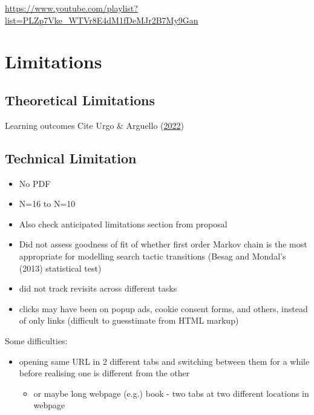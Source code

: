 \documentclass[letterpaper, nobind]{templates/ociamthesis}
\providecommand{\tightlist}{%
  \setlength{\itemsep}{0pt}\setlength{\parskip}{0pt}}
\begin{document}
\url{https://www.youtube.com/playlist?list=PLZp7Vke_WTVr8E4dM1fDeMJr2B7My9Gan}

\hypertarget{limitations}{%
\section{Limitations}\label{limitations}}

\hypertarget{theoretical-limitations}{%
\subsection{Theoretical Limitations}\label{theoretical-limitations}}

Learning outcomes
Cite Urgo \& Arguello (\protect\hyperlink{ref-urgo2022learning}{2022})

\hypertarget{technical-limitation}{%
\subsection{Technical Limitation}\label{technical-limitation}}

\begin{itemize}
\tightlist
\item
  No PDF
\item
  N=16 to N=10
\item
  Also check anticipated limitations section from proposal
\item
  Did not assess goodness of fit of whether first order Markov chain is the most appropriate for modelling search tactic transitions (Besag and Mondal's (2013) statistical test)
\item
  did not track revisits across different tasks
\item
  clicks may have been on popup ads, cookie consent forms, and others, instead of only links (difficult to guesstimate from HTML markup)
\end{itemize}

Some difficulties:

\begin{itemize}
\tightlist
\item
  opening same URL in 2 different tabs and switching between them for a while before realising one is different from the other

  \begin{itemize}
  \tightlist
  \item
    or maybe long webpage (e.g.) book - two tabs at two different locations in webpage
  \end{itemize}
\end{itemize}
\end{document}
